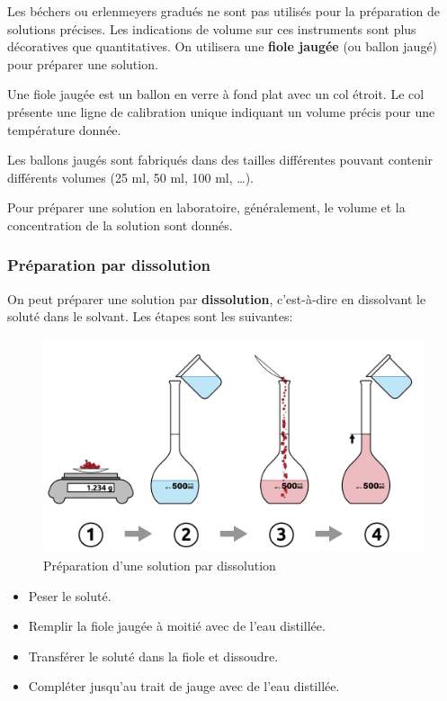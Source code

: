 \documentclass[
  11pt,
  a4paper,
  openany]{book}
\providecommand{\tightlist}{%
  \setlength{\itemsep}{0pt}\setlength{\parskip}{0pt}}
\begin{document}
Les béchers ou erlenmeyers gradués ne sont pas utilisés pour la préparation de solutions précises. Les indications de volume sur ces instruments sont plus décoratives que quantitatives. On utilisera une \textbf{fiole jaugée} (ou ballon jaugé) pour préparer une solution.

Une fiole jaugée est un ballon en verre à fond plat avec un col étroit. Le col présente une ligne de calibration unique indiquant un volume précis pour une température donnée.

Les ballons jaugés sont fabriqués dans des tailles différentes pouvant contenir différents volumes (25 ml, 50 ml, 100 ml, \ldots).

Pour préparer une solution en laboratoire, généralement, le volume et la concentration de la solution sont donnés.

\newpage

\subsubsection{Préparation par dissolution}\label{pruxe9paration-par-dissolution}

On peut préparer une solution par \textbf{dissolution}, c'est-à-dire en dissolvant le soluté dans le solvant. Les étapes sont les suivantes:

\begin{figure}

{\centering \includegraphics[width=0.5\linewidth]{images/preparation-1} 

}

\caption{Préparation d'une solution par dissolution}\label{fig:preparation-1}
\end{figure}

\begin{itemize}
\tightlist
\item
  Peser le soluté.
\item
  Remplir la fiole jaugée à moitié avec de l'eau distillée.
\item
  Transférer le soluté dans la fiole et dissoudre.
\item
  Compléter jusqu'au trait de jauge avec de l'eau distillée.
\end{itemize}
\end{document}
